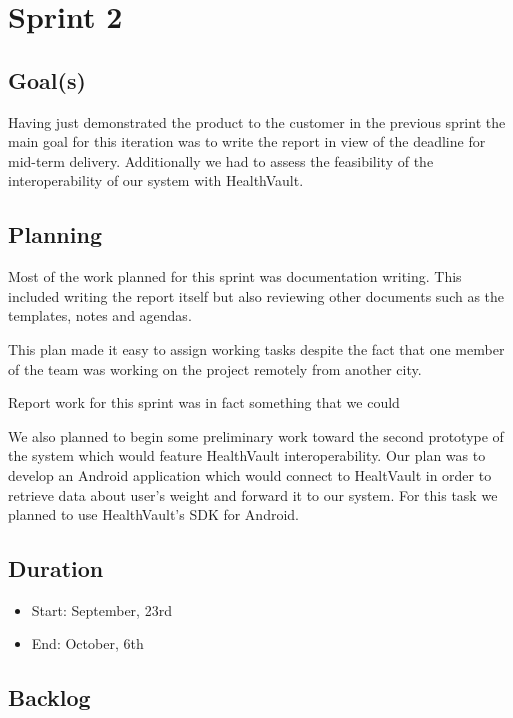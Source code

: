 

\chapter{Sprint 2}
\label{Sprint0}

\section{Goal(s)}
Having just demonstrated the product to the customer in the previous sprint the main goal
for this iteration was to write the report in view of the deadline for mid-term delivery.
Additionally we had to assess the feasibility of the interoperability of our system with HealthVault.


\section{Planning}
Most of the work planned for this sprint was documentation writing.
This included writing the report itself but also reviewing other documents such as the templates, notes and agendas.

This plan made it easy to assign working tasks despite the fact that one member
of the team was working on the project remotely from another city.

Report work for this sprint was in fact something that we could


We also planned to begin some preliminary work toward the second prototype of the system which would
feature HealthVault interoperability. Our plan was to develop an Android application which would connect
to HealtVault in order to retrieve data about user's weight and forward it to our system. For this task
we planned to use HealthVault's SDK for Android.


\section{Duration}
\begin{itemize}
\item Start: September, 23rd
\item End: October, 6th
\end{itemize}

\section{Backlog}

